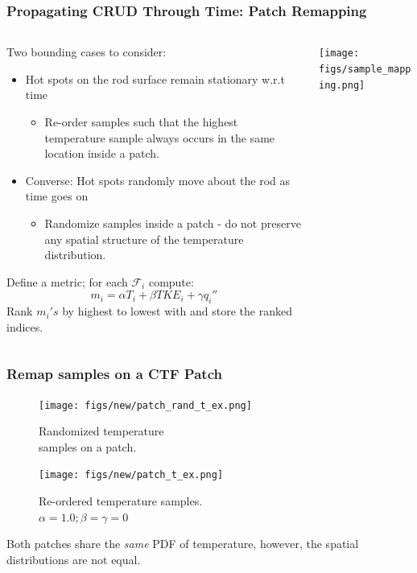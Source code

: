 \documentclass[t, pdftex]{beamer}
\begin{document}
\begin{frame}[shrink=20]
\frametitle{Propagating CRUD Through Time: Patch Remapping}
\begin{columns}
\begin{column}{0.5\textwidth}
   Two bounding cases to consider:
\begin{itemize}
\item Hot spots on the rod surface remain stationary w.r.t time
	\begin{itemize}
	\item Re-order samples such that the highest temperature sample always occurs in the same location inside a patch.
	\end{itemize}
\item Converse: Hot spots randomly move about the rod as time goes on
	\begin{itemize}
	\item Randomize samples inside a patch - do not preserve any spatial structure of the temperature distribution.
	\end{itemize}
\end{itemize}
Define a metric; for each $\mathcal F_i$ compute:
\[
m_i = \alpha T_i + \beta TKE_i + \gamma q_i''
\]
Rank $m_i's$ by highest to lowest with and store the ranked indices.
\end{column}
\begin{column}{0.5\textwidth}  %
    \begin{center}
     \texttt{[image: figs/sample\_mapping.png]}
     \end{center}
\end{column}
\end{columns}
\end{frame}

\begin{frame}
\frametitle{Remap samples on a CTF Patch}
    \begin{figure}
        \centering
        \begin{minipage}{.5\textwidth}
            \centering
            \texttt{[image: figs/new/patch\_rand\_t\_ex.png]}
            \caption{\centering Randomized temperature \\ samples on a patch.}
        \end{minipage}%
        \begin{minipage}{.5\textwidth}
            \centering
            \texttt{[image: figs/new/patch\_t\_ex.png]}
            \caption{\centering Re-ordered temperature samples. \\ $\alpha=1.0; \beta=\gamma=0$}
        \end{minipage}
    \end{figure}
Both patches share the \emph{same} PDF of temperature, however, the spatial distributions are not equal.
\end{frame}
\end{document}
